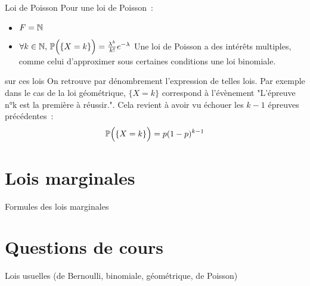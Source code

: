 \begin{exemple}{}{Loi de Poisson}
    Pour une loi de Poisson~:
    \begin{itemize}
        \item $F = \mathbb{N}$
        \item $\forall k \in \mathbb{N},\, \mathbb{P}\Big(\{X = k\}\Big) = \frac{\lambda^k}{k!}e^{-\lambda}$
        Une loi de Poisson a des intérêts multiples, comme celui d'approximer sous certaines conditions une loi binomiale.
    \end{itemize}
\end{exemple}

\begin{remarque}{}{sur ces lois}
    On retrouve par dénombrement l'expression de telles lois. Par exemple dans le cas de la loi géométrique, $\{X = k\}$ correspond à l'évènement "L'épreuve n°k est la première à réussir.". Cela revient à avoir vu échouer les $k-1$ épreuves précédentes~:
    $$\mathbb{P}\Big(\{X = k\}\Big) = p (1-p)^{k-1}$$

\end{remarque}


\section{Lois marginales}

\begin{proposition}{}{Formules des lois marginales}
    
\end{proposition}

\section*{Questions de cours}

\begin{enumeratebf}
    \item Lois usuelles (de Bernoulli, binomiale, géométrique, de Poisson)
\end{enumeratebf}

